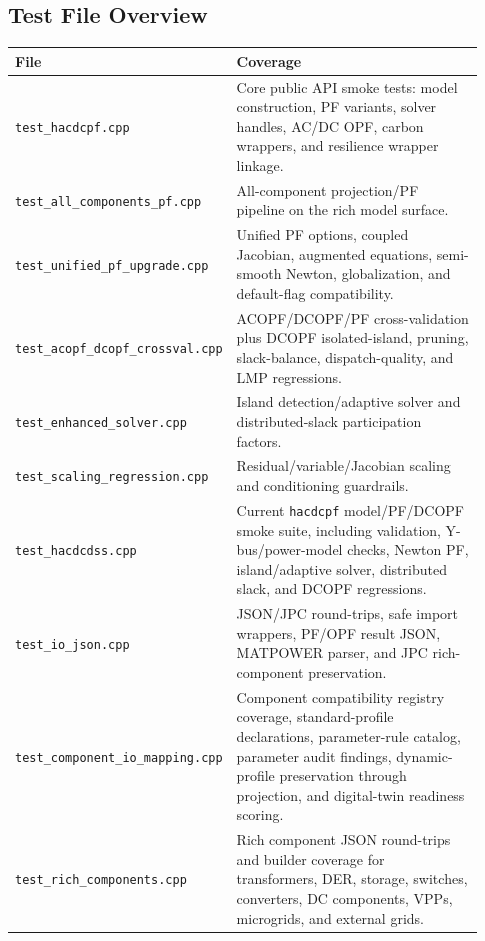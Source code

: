 \subsection{Test File Overview}

\begin{longtable}{L{0.34\linewidth}L{0.59\linewidth}}
\toprule
File & Coverage \\
\midrule
\endhead
\texttt{test\_hacdcpf.cpp} & Core public API smoke tests: model construction, PF variants, solver handles, AC/DC OPF, carbon wrappers, and resilience wrapper linkage. \\
\texttt{test\_all\_components\_pf.cpp} & All-component projection/PF pipeline on the rich model surface. \\
\texttt{test\_unified\_pf\_upgrade.cpp} & Unified PF options, coupled Jacobian, augmented equations, semi-smooth Newton, globalization, and default-flag compatibility. \\
\texttt{test\_acopf\_dcopf\_crossval.cpp} & ACOPF/DCOPF/PF cross-validation plus DCOPF isolated-island, pruning, slack-balance, dispatch-quality, and LMP regressions. \\
\texttt{test\_enhanced\_solver.cpp} & Island detection/adaptive solver and distributed-slack participation factors. \\
\texttt{test\_scaling\_regression.cpp} & Residual/variable/Jacobian scaling and conditioning guardrails. \\
\texttt{test\_hacdcdss.cpp} & Current \texttt{hacdcpf} model/PF/DCOPF smoke suite, including validation, Y-bus/power-model checks, Newton PF, island/adaptive solver, distributed slack, and DCOPF regressions. \\
\texttt{test\_io\_json.cpp} & JSON/JPC round-trips, safe import wrappers, PF/OPF result JSON, MATPOWER parser, and JPC rich-component preservation. \\
\texttt{test\_component\_io\_mapping.cpp} & Component compatibility registry coverage, standard-profile declarations, parameter-rule catalog, parameter audit findings, dynamic-profile preservation through projection, and digital-twin readiness scoring. \\
\texttt{test\_rich\_components.cpp} & Rich component JSON round-trips and builder coverage for transformers, DER, storage, switches, converters, DC components, VPPs, microgrids, and external grids. \\

\end{longtable}

